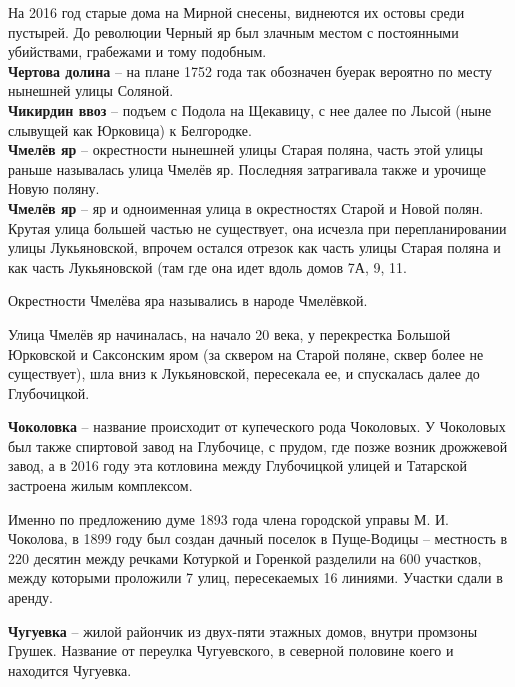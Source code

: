 На 2016 год старые дома на Мирной снесены, виднеются их остовы среди пустырей. До революции Черный яр был злачным местом с постоянными убийствами, грабежами и тому подобным.\\

\textbf{Чертова долина} – на плане 1752 года так обозначен буерак вероятно по месту нынешней улицы Соляной.\\

\textbf{Чикирдин ввоз} – подъем с Подола на Щекавицу, с нее далее по Лысой (ныне слывущей как Юрковица) к Белгородке.\\

\textbf{Чмелёв яр} – окрестности нынешней улицы Старая поляна, часть этой улицы раньше называлась улица Чмелёв яр. Последняя затрагивала также и урочище Новую поляну.\\

\textbf{Чмелёв яр} – яр и одноименная улица в окрестностях Старой и Новой полян. Крутая улица большей частью не существует, она исчезла при перепланировании улицы Лукьяновской, впрочем остался отрезок как часть улицы Старая поляна и как часть Лукьяновской (там где она идет вдоль домов 7А, 9, 11.

Окрестности Чмелёва яра назывались в народе Чмелёвкой.

Улица Чмелёв яр начиналась, на начало 20 века, у перекрестка Большой Юрковской и Саксонским яром (за сквером на Старой поляне, сквер более не существует), шла вниз к Лукьяновской, пересекала ее, и спускалась далее до Глубочицкой.


\textbf{Чоколовка} – название происходит от купеческого рода Чоколовых. У Чоколовых был также спиртовой завод на Глубочице, с прудом, где позже возник дрожжевой завод, а в 2016 году эта котловина между Глубочицкой улицей и Татарской застроена жилым комплексом.

Именно по предложению думе 1893 года члена городской управы М. И. Чоколова, в 1899 году был создан дачный поселок в Пуще-Водицы – местность в 220 десятин между речками Котуркой и Горенкой разделили на 600 участков, между которыми проложили 7 улиц, пересекаемых 16 линиями. Участки сдали в аренду.

\textbf{Чугуевка} – жилой райончик из двух-пяти этажных домов, внутри промзоны Грушек. Название от переулка Чугуевского, в северной половине коего и находится Чугуевка.